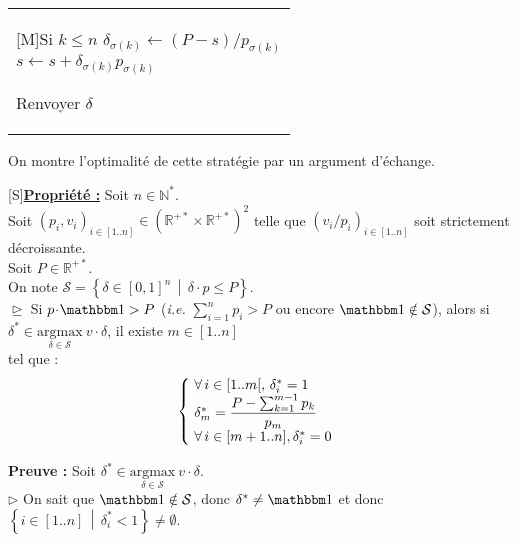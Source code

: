 \documentclass{scrartcl}
\renewcommand{\cal}[1]{\mathcal{#1}}
\newcommand{\bb}[1]{\mathbb{#1}}
\newcommand{\elt}[1]{\textbf{#1}}
\newcommand{\dotp}{\! \cdot \!}
\newcommand{\x}{\! \times \!}
\newcommand{\1}{\bbm{1}}
\begin{document}
				\\
				\hspace*{10mm}
				\begin{tabular}{|| l}
					\parbox{150mm}{
						\begin{center}[M]{Si $k \leq n$}
							\( \delta_{\sigma(k)} \leftarrow (P - s)/p_{\sigma(k)} \) \\
							\( s \leftarrow s + \delta_{\sigma(k)} p_{\sigma(k)} \)
						\end{center}
						Renvoyer $\delta$
					}
				\end{tabular}
			
			On montre l'optimalité de cette stratégie par un argument d'échange.
				\\[0mm]
			\begin{center}[S]{\elt{\underline{Propriété :}}}
				Soit $n \in \bb{N}^*$. \\
				Soit \( (p_i, v_i)_{i \in [1..n]} \in (\bb{R}^{+*} \x \bb{R}^{+*})^2 \) telle que \( \left( v_i/p_i \right)_{i \in [1..n]} \) soit strictement décroissante. \\[-0.8mm]
				Soit $P \in \bb{R}^{+*}$. \\
				On note \( \cal{S} = \left\{ \delta \in [0, 1]^n \, \middle| \, \delta \dotp p \leq P \right\} \).
				\\[1mm]
				$\trianglerighteq$ Si \( p \dotp \1 > P \) (\emph{i.e.} \( \displaystyle \sum_{i=1}^n p_i > P \) ou encore \( \1 \notin \cal{S} \)), alors si \( \delta^* \in \underset{\delta \in \cal{S}}{\mathrm{argmax}} \: v \dotp \delta \), il existe \( m \in [1..n] \) \\[-3.2mm] tel que :
				\\[-8mm] \renewcommand{\arraystretch}{1.2}
					\[
						\left\lbrace \hspace{-1mm}
						\begin{tabular}{l}
							\( \forall \, i \in [1..m[, \, \delta^*_i = 1 \) \\
							\( \delta^*_m = \displaystyle \frac{P - \sum_{k=1}^{m-1} p_k}{p_m} \) \\
							\( \forall \, i \in [m+1..n], \delta^*_i = 0 \)
						\end{tabular} \right.
					\]
				\renewcommand{\arraystretch}{1}
			\end{center}
			\elt{Preuve :} Soit \( \delta^* \in \underset{\delta \in \cal{S}}{\mathrm{argmax}} \: v \dotp \delta \). \\
			$\triangleright$ On sait que $\1 \notin \cal{S}$, donc $\delta^* \neq \1$ et donc \( \left\{ i \in [1..n] \, \middle| \, \delta^*_i < 1 \right\} \neq \emptyset \).
\end{document}
